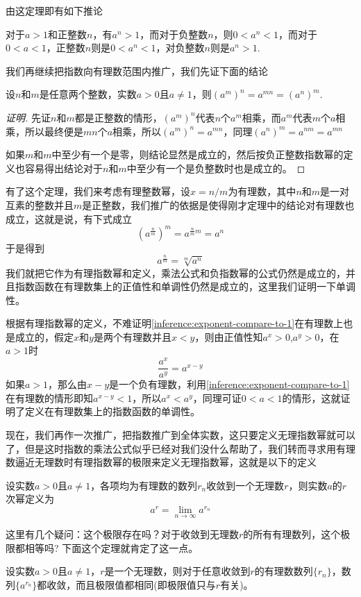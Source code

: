 由这定理即有如下推论
\begin{inference}
  \label{inference:exponent-compare-to-1}
对于$a>1$和正整数$n$，有$a^n>1$，而对于负整数$n$，则$0<a^n<1$，而对于$0<a<1$，正整数$n$则是$0<a^n<1$，对负整数$n$则是$a^n>1$.
\end{inference}


我们再继续把指数向有理数范围内推广，我们先证下面的结论
\begin{theorem}
 设$n$和$m$是任意两个整数，实数$a>0$且$a \neq 1$，则$(a^m)^n = a^{mn} = (a^n)^m$. 
\end{theorem}

\begin{proof}[证明]
  先证$n$和$m$都是正整数的情形，$(a^m)^n$代表$n$个$a^m$相乘，而$a^m$代表$m$个$a$相乘，所以最终便是$mn$个$a$相乘，所以$(a^m)^n=a^{mn}$，同理$(a^n)^m=a^{nm}=a^{mn}$

  如果$m$和$m$中至少有一个是零，则结论显然是成立的，然后按负正整数指数幂的定义也容易得出结论对于$n$和$m$中至少有一个是负整数时也是成立的。
\end{proof}

有了这个定理，我们来考虑有理整数幂，设$x=n/m$为有理数，其中$n$和$m$是一对互素的整数并且$m$是正整数，我们推广的依据是使得刚才定理中的结论对有理数也成立，这就是说，有下式成立
\[ (a^{\frac{n}{m}})^m = a^{\frac{n}{m}m} = a^n \]
于是得到
\[ a^{\frac{n}{m}} = \sqrt[m]{a^n} \]
我们就把它作为有理指数幂和定义，乘法公式和负指数幂的公式仍然是成立的，并且指数函数在有理数集上的正值性和单调性仍然是成立的，这里我们证明一下单调性。

根据有理指数幂的定义，不难证明\autoref{inference:exponent-compare-to-1}在有理数上也是成立的，假定$x$和$y$是两个有理数并且$x<y$，则由正值性知$a^x>0$,$a^y>0$，在$a>1$时
\[ \frac{a^x}{a^y} = a^{x-y} \]
如果$a>1$，那么由$x-y$是一个负有理数，利用\autoref{inference:exponent-compare-to-1} 在有理数的情形即知$a^{x-y}<1$，所以$a^x<a^y$，同理可证$0<a<1$的情形，这就证明了定义在有理数集上的指数函数的单调性。

现在，我们再作一次推广，把指数推广到全体实数，这只要定义无理指数幂就可以了，但是这时指数的乘法公式似乎已经对我们没什么帮助了，我们转而寻求用有理数逼近无理数时有理指数幂的极限来定义无理指数幂，这就是以下的定义
\begin{definition}
  设实数$a>0$且$a \neq 1$，各项均为有理数的数列$r_n$收敛到一个无理数$r$，则实数$a$的$r$次幂定义为
  \[ a^r = \lim_{n \to \infty} a^{r_n} \]
\end{definition}

这里有几个疑问：这个极限存在吗？对于收敛到无理数$r$的所有有理数列，这个极限都相等吗? 下面这个定理就肯定了这一点。
\begin{theorem}
  设实数$a>0$且$a \neq 1$，$r$是一个无理数，则对于任意收敛到$r$的有理数数列$\{r_n\}$，数列$\{a^{r_n}\}$都收敛，而且极限值都相同(即极限值只与$r$有关)。
\end{theorem}

